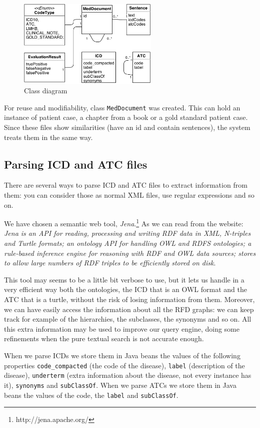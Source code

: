 \documentclass{article}
\begin{document}
\begin{figure}[h!]
  \centering
    \includegraphics[width=0.6\textwidth]{class}
    \caption{Class diagram}
\end{figure}

For reuse and modifiability, class \texttt{MedDocument} was created. This can hold an instance of patient case, a chapter from a book or a gold standard patient case. Since these files show similarities (have an id and contain sentences), the system treats them in the same way.

\subsection{Parsing ICD and ATC files}

There are several ways to parse ICD and ATC files to extract information from them: you can consider those as normal XML files, use regular expressions and so on.

We have chosen a semantic web tool, \emph{Jena}.\footnote{http://jena.apache.org/} As we can read from the website: \emph{Jena is an API for reading, processing and writing RDF data in XML, N-triples and Turtle formats; an ontology API for handling OWL and RDFS ontologies; a rule-based inference engine for reasoning with RDF and OWL data sources; stores to allow large numbers of RDF triples to be efficiently stored on disk}. 

This tool may seems to be a little bit verbose to use, but it lets us handle in a very efficient way both the ontologies, the ICD that is an OWL format and the ATC that is a turtle, without the risk of losing information from them. Moreover, we can have easily access the information about all the RFD graphs: we can keep track for example of the hierarchies, the subclasses, the synonyms and so on. All this extra information may be used to improve our query engine, doing some refinements when the pure textual search is not accurate enough.

When we parse ICDs we store them in Java beans the values of the following properties \texttt{code\_compacted} (the code of the disease), \texttt{label} (description of the disease), \texttt{underterm} (extra information about the disease, not every instance has it), \texttt{synonyms} and \texttt{subClassOf}.
When we parse ATCs we store them in Java beans the values of the code, the \texttt{label} and \texttt{subClassOf}.
\end{document}
